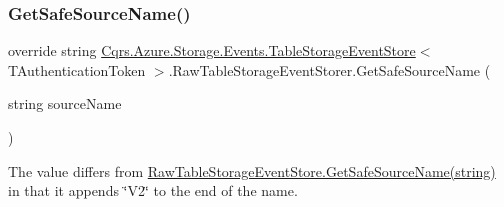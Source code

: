 \subsubsection{\texorpdfstring{Get\+Safe\+Source\+Name()}{GetSafeSourceName()}}
{\footnotesize\ttfamily override string \hyperlink{classCqrs_1_1Azure_1_1Storage_1_1Events_1_1TableStorageEventStore}{Cqrs.\+Azure.\+Storage.\+Events.\+Table\+Storage\+Event\+Store}$<$ T\+Authentication\+Token $>$.Raw\+Table\+Storage\+Event\+Storer.\+Get\+Safe\+Source\+Name (\begin{DoxyParamCaption}\item[{string}]{source\+Name }\end{DoxyParamCaption})\hspace{0.3cm}{\ttfamily [protected]}}



The value differs from \hyperlink{classCqrs_1_1Azure_1_1BlobStorage_1_1Events_1_1TableStorageEventStore_1_1RawTableStorageEventStore_ab02dd26098d25c2663abdf3da9f57f0f_ab02dd26098d25c2663abdf3da9f57f0f}{Raw\+Table\+Storage\+Event\+Store.\+Get\+Safe\+Source\+Name(string)} in that it appends \char`\"{}\+V2\char`\"{} to the end of the name. 

